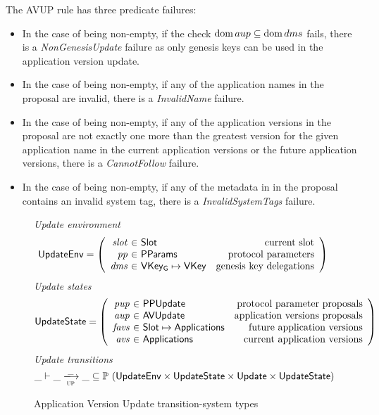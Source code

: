 The AVUP rule has three predicate failures:
\begin{itemize}
\item In the case of  being non-empty, if the check $\operatorname{dom} aup \subseteq
  \operatorname{dom} dms$ fails, there is a \emph{NonGenesisUpdate} failure as only genesis keys
  can be used in the application version update.
\item In the case of  being non-empty, if any of the application names
  in the proposal are invalid, there is a \emph{InvalidName} failure.
\item In the case of  being non-empty, if any of the application versions
  in the proposal are not exactly one more than the greatest version for the given
  application name in the current application versions or the future application
  versions, there is a \emph{CannotFollow} failure.
\item In the case of  being non-empty, if any of the metadata in
  in the proposal contains an invalid system tag, there is a \emph{InvalidSystemTags} failure.
\end{itemize}

\clearpage

\begin{figure}[htb]
  \emph{Update environment}
  \begin{equation*}
    \UpdateEnv =
    \left(
      \begin{array}{r@{~\in~}lr}
        \var{slot} & \Slot & \text{current slot}\\
        \var{pp} & \PParams & \text{protocol parameters}\\
        \var{dms} & \VKeyGen\mapsto\VKey & \text{genesis key delegations} \\
      \end{array}
    \right)
  \end{equation*}
  \emph{Update states}
  \begin{equation*}
    \UpdateState =
    \left(
      \begin{array}{r@{~\in~}lr}
        \var{pup} & \PPUpdate & \text{protocol parameter proposals} \\
        \var{aup} & \AVUpdate & \text{application versions proposals} \\
        \var{favs} & \Slot\mapsto\Applications & \text{future application versions} \\
        \var{avs} & \Applications & \text{current application versions} \\
      \end{array}
    \right)
  \end{equation*}
  \emph{Update transitions}
  \begin{equation*}
    \_ \vdash
    \var{\_} \trans{up}{\_} \var{\_}
    \subseteq \powerset (\UpdateEnv \times \UpdateState \times \Update \times \UpdateState)
  \end{equation*}
  \caption{Application Version Update transition-system types}
  \label{fig:ts-types:update}
\end{figure}


